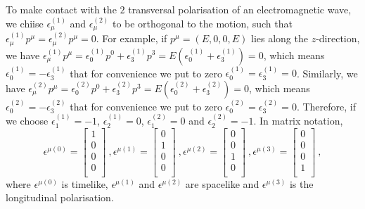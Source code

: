     To make contact with the $2$ transversal polarisation of an electromagnetic wave, we chiise $\epsilon_\mu^{(1)}$ and $\epsilon_\mu^{(2)}$ to be orthogonal to the motion, such that $\epsilon_\mu^{(1)} p^\mu = \epsilon_\mu^{(2)} p^\mu = 0$. For example, if $p^\mu = (E, 0, 0, E)$ lies along the $z$-direction, we have $\epsilon_\mu^{(1)} p^\mu = \epsilon_0^{(1)} p^0 + \epsilon_3^{(1)} p^3 = E (\epsilon_0^{(1)} + \epsilon_3^{(1)}) = 0$, which means $\epsilon_0^{(1)} = -\epsilon_3^{(1)}$ that for convenience we put to zero $\epsilon_0^{(1)} = \epsilon_3^{(1)} = 0$. Similarly, we have $\epsilon_\mu^{(2)} p^\mu = \epsilon_0^{(2)} p^0 + \epsilon_3^{(2)} p^3 = E (\epsilon_0^{(2)} + \epsilon_3^{(2)}) = 0$, which means $\epsilon_0^{(2)} = -\epsilon_3^{(2)}$ that for convenience we put to zero $\epsilon_0^{(2)} = \epsilon_3^{(2)} = 0$. Therefore, if we choose $\epsilon_1^{(1)} = -1$, $\epsilon_2^{(1)} = 0$, $\epsilon_1^{(2)} = 0$ and $\epsilon_2^{(2)} = -1$. In matrix notation, 
    \begin{equation*}
        \epsilon^{\mu (0)} = \begin{bmatrix}
            1 \\ 0 \\ 0 \\ 0 \\
        \end{bmatrix} ~,  \epsilon^{\mu (1)} = \begin{bmatrix}
            0 \\ 1 \\ 0 \\ 0 \\
        \end{bmatrix} ~, \epsilon^{\mu (2)} = \begin{bmatrix}
            0 \\ 0 \\ 1 \\ 0 \\
        \end{bmatrix} ~, \epsilon^{\mu (3)} = \begin{bmatrix}
            0 \\ 0 \\ 0 \\ 1 \\
        \end{bmatrix} ~,
    \end{equation*}
    where $\epsilon^{\mu (0)}$ is timelike, $\epsilon^{\mu (1)}$ and $\epsilon^{\mu (2)}$ are spacelike and $\epsilon^{\mu (3)}$ is the longitudinal polarisation.

